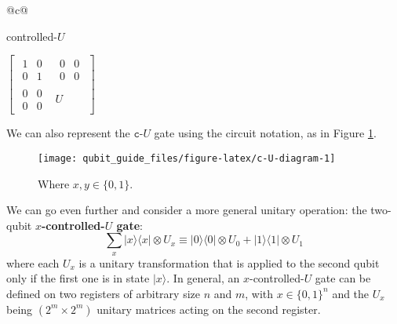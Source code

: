 \documentclass[fleqn]{article}
\newenvironment{idea}{\noindent}{\medskip}
\begin{document}
\begin{idea}

\begin{longtable}[]{@{}c@{}}
\toprule
\begin{minipage}[b]{0.97\columnwidth}\centering
controlled-\(U\)\strut
\end{minipage}\tabularnewline
\midrule
\endhead
\begin{minipage}[t]{0.97\columnwidth}\centering
\(\left[\begin{array}{c|c}\begin{matrix}1&0\\0&1\end{matrix}&\begin{matrix}0&0\\0&0\end{matrix}\\\hline\begin{matrix}0&0\\0&0\end{matrix}&U\end{array}\right]\)\strut
\end{minipage}\tabularnewline
\bottomrule
\end{longtable}


\end{idea}

We can also represent the \(\texttt{c-}U\) gate using the circuit notation, as in Figure \ref{fig:c-U-diagram}.



\begin{figure}[H]

{\centering \texttt{[image: qubit\_guide\_files/figure-latex/c-U-diagram-1]} 

}

\caption{Where \(x,y\in\{0,1\}\).}\label{fig:c-U-diagram}
\end{figure}

We can go even further and consider a more general unitary operation: the two-qubit \textbf{\(x\)-controlled-\(U\) gate}:
\[
  \sum_x |x\rangle\langle x|\otimes U_x
  \equiv
  |0\rangle\langle 0|\otimes U_0 + |1\rangle\langle 1|\otimes U_1
\]
where each \(U_x\) is a unitary transformation that is applied to the second qubit only if the first one is in state \(|x\rangle\).
In general, an \(x\)-controlled-\(U\) gate can be defined on two registers of arbitrary size \(n\) and \(m\), with \(x\in\{0,1\}^n\) and the \(U_x\) being \((2^m\times 2^m)\) unitary matrices acting on the second register.
\end{document}
